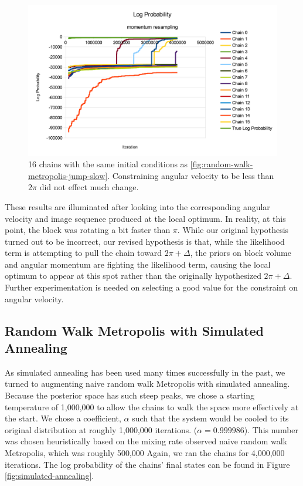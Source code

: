 \documentclass[runningheads]{llncs}
\begin{document}
\begin{figure}[t]
\begin{center}
   \includegraphics[width=0.8\linewidth]{figs/ang-vel-constraint.png}
\end{center}
   \caption{16 chains with the same initial conditions as 
        \ref{fig:random-walk-metropolis-jump-slow}. Constraining angular 
            velocity to be less than $2\pi$ did not effect much change.}
\label{fig:ang-vel-constraint}
\end{figure}

These results are illuminated after looking into the corresponding angular 
velocity and image sequence produced at the local optimum. In reality, at this 
point, the block 
was rotating a bit faster than $\pi$. While our original hypothesis turned out 
to be incorrect, our revised hypothesis is that, while the 
likelihood term is attempting to pull the chain toward $2\pi + \Delta$, the 
priors on block volume and angular momentum are fighting the likelihood term, 
causing the local optimum to appear at this spot rather than the originally 
hypothesized $2\pi + \Delta$. Further experimentation is needed on selecting 
a good value for the constraint on angular velocity.

\subsection{Random Walk Metropolis with Simulated Annealing}

As simulated annealing has been used many times successfully in the past, we 
turned to augmenting naive random walk Metropolis 
with simulated annealing. Because the posterior space has such steep peaks, we chose 
a starting temperature of 1,000,000 to allow the chains to walk the space more 
effectively at the start. We chose a coefficient, $\alpha$ such that the system 
would be cooled to its original distribution at roughly 1,000,000 iterations. 
($\alpha=0.999986$). This number was chosen heuristically based on the mixing 
rate observed naive random walk Metropolis, which was roughly 500,000 Again, we ran the chains for 4,000,000 iterations. The log  
probability of the chains' final states can be found in Figure \ref{fig:simulated-annealing}.
\end{document}
